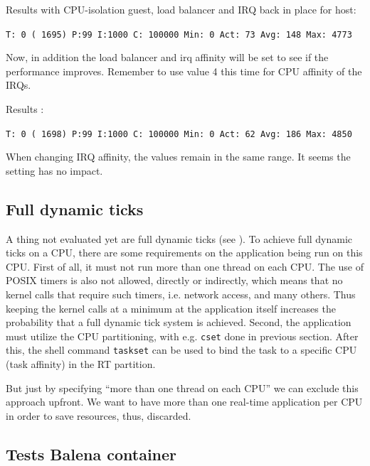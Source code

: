 \documentclass[]{scrartcl}
\begin{document}
\bigskip

\noindent Results with CPU-isolation guest, load balancer and IRQ back in place for host:

\noindent \small \texttt{T: 0 ( 1695) P:99 I:1000 C: 100000 Min:      0 Act:   73 Avg:  148 Max:    4773}


Now, in addition the load balancer and irq affinity will be set to see if the performance improves. Remember to use value 4 this time for CPU affinity of the IRQs.
\bigskip

\noindent Results :

\noindent \small \texttt{T: 0 ( 1698) P:99 I:1000 C: 100000 Min:      0 Act:   62 Avg:  186 Max:    4850}

When changing IRQ affinity, the values remain in the same range. It seems the setting has no impact.

\subsection{Full dynamic ticks}

A thing not evaluated yet are full dynamic ticks (see \cite{lrt02}). To achieve full dynamic ticks on a CPU, there are some requirements on the application being run on this CPU. First of all, it must not run more than one thread on each CPU. The use of POSIX timers is also not allowed, directly or indirectly, which means that no kernel calls that require such timers, i.e. network access, and many others. Thus keeping the kernel calls at a minimum at the application itself increases the probability that a full dynamic tick system is achieved.
Second, the application must utilize the CPU partitioning, with e.g. \texttt{cset} done in previous section. After this, the shell command \texttt{taskset} can be used to bind the task to a specific CPU (task affinity) in the RT partition.

But just by specifying ``more than one thread on each CPU'' we can exclude this approach upfront. We want to have more than one real-time application per CPU in order to save resources, thus, discarded.

\subsection{Tests Balena container}
\end{document}

